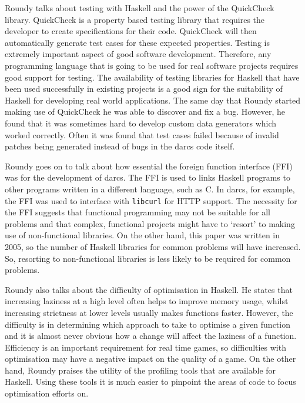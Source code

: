 Roundy talks about testing with Haskell and the power of the QuickCheck library.
QuickCheck is a property based testing library that requires the developer to
create specifications for their code. QuickCheck will then automatically generate
test cases for these expected properties.\cite{claessen2000} Testing is extremely
important aspect of good software development. Therefore, any programming language
that is going to be used for real software projects requires good support for
testing. The availability of testing libraries for Haskell that have been used
successfully in existing projects is a good sign for the suitability of Haskell
for developing real world applications. The same day that Roundy started making
use of QuickCheck he was able to discover and fix a bug. However, he found that
it was sometimes hard to develop custom data generators which worked correctly.
Often it was found that test cases failed because of invalid patches being generated
instead of bugs in the darcs code itself.

Roundy goes on to talk about how essential the foreign function interface (FFI)
was for the development of darcs. The FFI is used to links Haskell programs to
other programs written in a different language, such as C. In darcs, for example,
the FFI was used to interface with \texttt{libcurl} for HTTP support. The necessity
for the FFI suggests that functional programming may not be suitable for all problems
and that complex, functional projects might have to `resort' to making use of
non-functional libraries. On the other hand, this paper was written in 2005, so
the number of Haskell libraries for common problems will have increased. So,
resorting to non-functional libraries is less likely to be required for common
problems.

Roundy also talks about the difficulty of optimisation in Haskell. He states that
increasing laziness at a high level often helps to improve memory usage, whilst
increasing strictness at lower levels usually makes functions faster. However,
the difficulty is in determining which approach to take to optimise a given
function and it is almost never obvious how a change will affect the laziness
of a function. Efficiency is an important requirement for real time games, so
difficulties with optimisation may have a negative impact on the quality of a
game. On the other hand, Roundy praises the utility of the profiling tools that
are available for Haskell. Using these tools it is much easier to pinpoint the
areas of code to focus optimisation efforts on.

